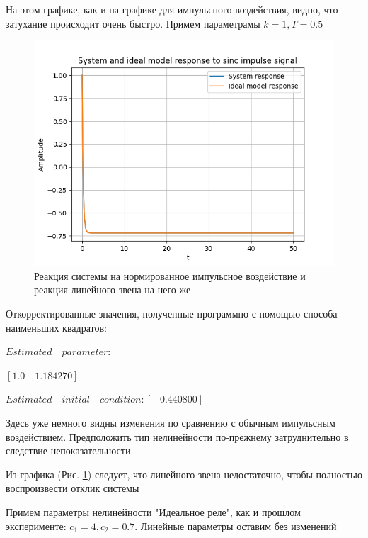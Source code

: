 На этом графике, как и на графике для импульсного воздействия, видно, что затухание происходит очень быстро. Примем параметрамы $ k = 1, T = 0.5 $

\begin{figure}[H]
	\centering
	\includegraphics[width=0.7\linewidth]{body/images/System-and-ideal-model-response-to-sinc-impulse-signal.png}
	\caption{Реакция системы на нормированное импульсное воздействие и реакция линейного звена на него же}
	\label{fig:9}
\end{figure}

Откорректированные значения, полученные программно с помощью способа наименьших квадратов:

$Estimated\quad parameter:$

\qquad$[1.0\quad 1.184270]$

$Estimated\quad initial\quad condition: [-0.440800]$

Здесь уже немного видны изменения по сравнению с обычным импульсным воздействием. Предположить тип нелинейности по-прежнему затруднительно в следствие непоказательности.

Из графика (Рис. \ref{fig:9}) следует, что линейного звена недостаточно, чтобы полностью воспроизвести отклик системы

Примем параметры нелинейности "Идеальное реле", как и прошлом эксперименте: $ c_1 = 4, c_2 = 0.7 $. Линейные параметры оставим без изменений

